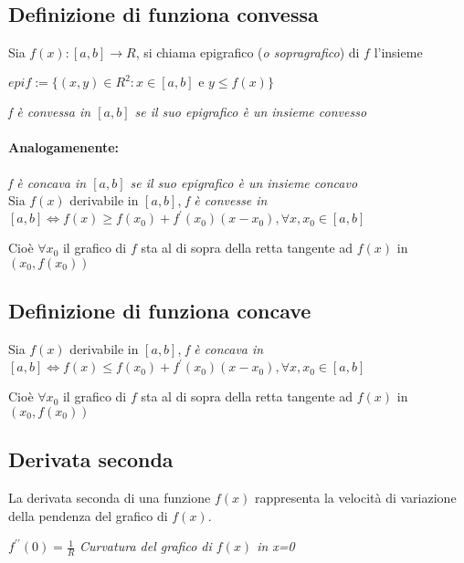 \subsection{Definizione di funziona convessa}
Sia $f(x):[a,b]\to R$, si chiama epigrafico (\textit{o sopragrafico}) di $f$
l'insieme
\begin{center}
	$epif:=\{(x,y)\in R^2:x\in[a,b]\text{ e }y\leq f(x)\}$
\end{center}
\textit{f è convessa in $[a,b]$ se il suo epigrafico è un insieme convesso}
\paragraph{Analogamenente:} \textit{f è concava in $[a,b]$ se il suo epigrafico
è un insieme concavo}\\
Sia $f(x)$ derivabile in $[a,b]$, \textit{f è convesse in
$[a,b]\Leftrightarrow f(x)\geq f(x_0)+f^\prime(x_0)(x-x_0), \forall
x,x_0\in[a,b]$}
\begin{center}
	Cioè $\forall x_0$ il grafico di $f$ sta al di sopra della retta tangente
	ad $f(x)$ in $(x_0,f(x_0))$
\end{center}
\subsection{Definizione di funziona concave}
Sia $f(x)$ derivabile in $[a,b]$, \textit{f è concava in
$[a,b]\Leftrightarrow f(x)\leq f(x_0)+f^\prime(x_0)(x-x_0), \forall
x,x_0\in[a,b]$}
\begin{center}
	Cioè $\forall x_0$ il grafico di $f$ sta al di sopra della retta tangente
	ad $f(x)$ in $(x_0,f(x_0))$
\end{center}
\subsection{Derivata seconda}
La derivata seconda di una funzione $f(x)$ rappresenta la velocità di
variazione della pendenza del grafico di $f(x)$.
\begin{center}
	$f^{\prime\prime}(0)=\frac{1}{R}$ \textit{Curvatura del grafico di $f(x)$
	in x=0}
\end{center}
